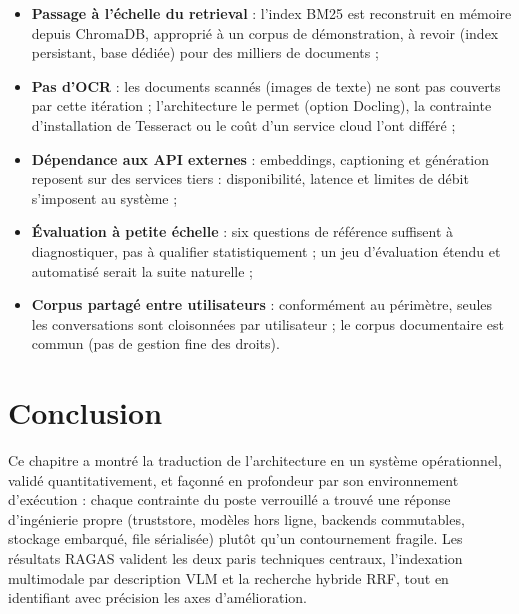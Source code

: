 \begin{itemize}
  \item \textbf{Passage à l'échelle du retrieval} : l'index BM25 est reconstruit en
        mémoire depuis ChromaDB, approprié à un corpus de démonstration, à revoir
        (index persistant, base dédiée) pour des milliers de documents ;
  \item \textbf{Pas d'OCR} : les documents scannés (images de texte) ne sont pas couverts
        par cette itération ; l'architecture le permet (option Docling), la contrainte
        d'installation de Tesseract ou le coût d'un service cloud l'ont différé ;
  \item \textbf{Dépendance aux API externes} : embeddings, captioning et génération
        reposent sur des services tiers : disponibilité, latence et limites de débit
        s'imposent au système ;
  \item \textbf{Évaluation à petite échelle} : six questions de référence suffisent à
        diagnostiquer, pas à qualifier statistiquement ; un jeu d'évaluation étendu et
        automatisé serait la suite naturelle ;
  \item \textbf{Corpus partagé entre utilisateurs} : conformément au périmètre, seules les
        conversations sont cloisonnées par utilisateur ; le corpus documentaire est commun
        (pas de gestion fine des droits).
\end{itemize}

\section{Conclusion}

Ce chapitre a montré la traduction de l'architecture en un système opérationnel, validé
quantitativement, et façonné en profondeur par son environnement d'exécution : chaque
contrainte du poste verrouillé a trouvé une réponse d'ingénierie propre (truststore,
modèles hors ligne, backends commutables, stockage embarqué, file sérialisée) plutôt qu'un
contournement fragile. Les résultats RAGAS valident les deux paris techniques centraux,
l'indexation multimodale par description VLM et la recherche hybride RRF, tout en
identifiant avec précision les axes d'amélioration.
